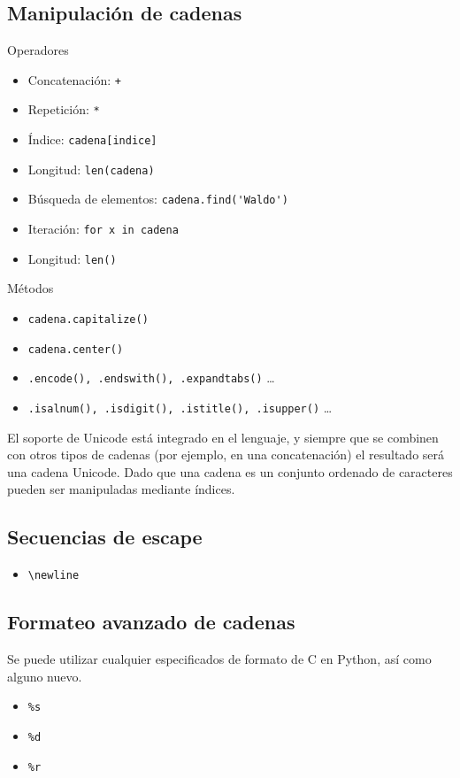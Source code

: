 \documentclass[12pt]{article} %
\begin{document}
\subsection{Manipulación de cadenas}
\Large Operadores
\begin{itemize}
	\item Concatenación: \verb|+|
	\item Repetición: \verb+*+
	\item Índice: \verb+cadena[indice]+
	\item Longitud: \verb+len(cadena)+
	\item Búsqueda de elementos: \verb+cadena.find('Waldo')+
	\item Iteración: \verb+for x in cadena+
	\item Longitud: \verb+len()+
\end{itemize}

\Large Métodos
\begin{itemize}
	\item \verb+cadena.capitalize()+
	\item \verb+cadena.center()+
	\item \verb+.encode(), .endswith(), .expandtabs()+ \dots
	\item \verb+.isalnum(), .isdigit(), .istitle(), .isupper()+ \dots
\end{itemize}


El soporte de Unicode está integrado en el lenguaje, y siempre que se combinen con otros tipos de cadenas (por ejemplo, en una concatenación) el resultado será una cadena Unicode.
Dado que una cadena es un conjunto ordenado de caracteres pueden ser manipuladas mediante índices.

\subsection{Secuencias de escape}
\begin{itemize}
	\item \verb+\newline+
\end{itemize}

\subsection{Formateo avanzado de cadenas}
Se puede utilizar cualquier especificados de formato de C en Python, así como alguno nuevo.
\begin{itemize}
	\item \verb+%s+
	\item \verb+%d+
	\item \verb+%r+
\end{itemize}
\end{document}
